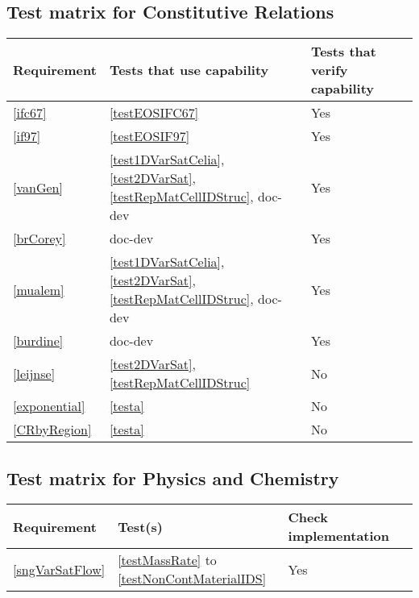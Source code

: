 \subsection{Test matrix for Constitutive Relations}
\begin{tabular}{|l|l|l|l|}
	\hline
	Requirement & Tests that use capability & Tests that verify capability \\
	\hline
	\hline
	\ref{ifc67} & \ref{testEOSIFC67} & Yes\\
	\hline
	\ref{if97} & \ref{testEOSIF97} & Yes \\
	\hline
		\ref{vanGen} & \ref{test1DVarSatCelia}, \ref{test2DVarSat}, \ref{testRepMatCellIDStruc}, doc-dev & Yes\\
	\hline
		\ref{brCorey} & doc-dev & Yes\\
	\hline
		\ref{mualem} & \ref{test1DVarSatCelia}, \ref{test2DVarSat},  \ref{testRepMatCellIDStruc}, doc-dev & Yes\\
	\hline
		\ref{burdine} & doc-dev & Yes\\
	\hline
		\ref{leijnse} &  \ref{test2DVarSat},  \ref{testRepMatCellIDStruc} & No \\
	\hline
		\ref{exponential} & \ref{testa} & No \\
	\hline
		\ref{CRbyRegion} & \ref{testa} & No \\
	\hline
\end{tabular}

\subsection{Test matrix for Physics and Chemistry}
\begin{tabular}{|l|l|l|l|}
	\hline
		Requirement & Test(s) & Check implementation \\
	\hline
	\hline
		\ref{sngVarSatFlow} &  \ref{testMassRate} to \ref{testNonContMaterialIDS} & Yes \\
	\hline
\end{tabular}

